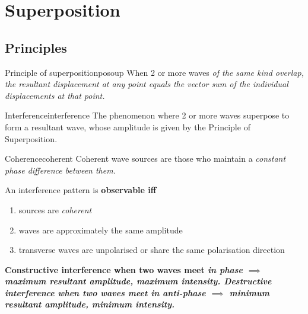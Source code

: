 \chapter{Superposition}
\section{Principles}
\begin{definition}{Principle of superposition}{posoup}
	When 2 or more waves \it{of the same kind} overlap, the resultant displacement
	at any point equals the \it{vector sum} of the \it{individual displacements}
	at that point.
\end{definition}

\begin{definition}{Interference}{interference}
	The phenomenon where 2 or more waves superpose to form a resultant wave,
	whose amplitude is given by the Principle of Superposition.
\end{definition}

\begin{definition}{Coherence}{coherent}
	Coherent wave sources are those who maintain a \it{constant phase difference}
	between them.
\end{definition}

An interference pattern is \bf{observable} iff
\begin{enumerate}
	\item sources are \it{coherent}
	\item waves are approximately the same amplitude
	\item transverse waves are unpolarised or share the same polarisation direction
\end{enumerate}

\bf{Constructive interference} when two waves meet \it{in phase} \(\implies\) maximum resultant amplitude, maximum intensity.
\bf{Destructive interference} when two waves meet \it{in anti-phase} \(\implies\) minimum resultant amplitude, minimum intensity.

